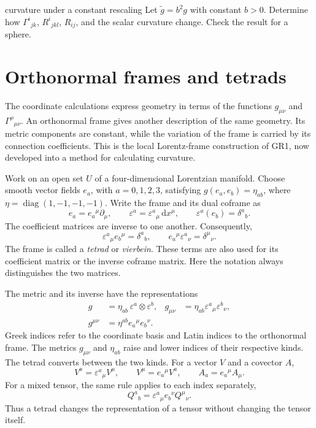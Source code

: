 \documentclass[11pt,a4paper]{article}
\numberwithin{equation}{section}
\newcommand{\dd}{\mathrm d}
\newcommand{\slidesref}[1]{\par\nobreak\smallskip\nobreak{\footnotesize\color{ink!60}\textsc{Source slides #1}}\par\nobreak\smallskip\nobreak}
\begin{document}
\begin{studentwork}[2.7cm]{curvature under a constant rescaling}
Let \(\widetilde g=b^2g\) with constant \(b>0\). Determine how
\(\Gamma^i{}_{jk}\), \(R^i{}_{jkl}\), \(R_{ij}\), and the scalar
curvature change. Check the result for a sphere.
\end{studentwork}

\section{Orthonormal frames and tetrads}
\label{gr2:sec:frames}
\slidesref{15--16}

The coordinate calculations express geometry in terms of the functions
\(g_{\mu\nu}\) and \(\Gamma^\rho{}_{\mu\nu}\). An orthonormal frame gives
another description of the same geometry. Its metric components are
constant, while the variation of the frame is carried by its connection
coefficients. This is the local Lorentz-frame construction of GR1,
now developed into a method for calculating curvature.

Work on an open set \(U\) of a four-dimensional Lorentzian manifold.
Choose smooth vector fields \(e_a\), with \(a=0,1,2,3\), satisfying
\(g(e_a,e_b)=\eta_{ab}\), where
\(\eta=\operatorname{diag}(1,-1,-1,-1)\). Write the frame and its dual
coframe as
\begin{equation}
 e_a=e_a{}^\mu\partial_\mu,
 \qquad
 \varepsilon^a=\varepsilon^a{}_\mu\,\dd x^\mu,
 \qquad
 \varepsilon^a(e_b)=\delta^a{}_b.
 \label{gr2:eq:tetrad-frame}
\end{equation}
The coefficient matrices are inverse to one another. Consequently,
\begin{equation}
 \varepsilon^a{}_\mu e_b{}^\mu=\delta^a{}_b,
 \qquad
 e_a{}^\mu\varepsilon^a{}_\nu=\delta^\mu{}_\nu.
 \label{gr2:eq:tetrad-inverses}
\end{equation}
The frame is called a \emph{tetrad} or \emph{vierbein}. These terms
are also used for its coefficient matrix or the inverse coframe matrix.
Here the notation always distinguishes the two matrices.

The metric and its inverse have the representations
\begin{align}
 g&=\eta_{ab}\,\varepsilon^a\otimes\varepsilon^b,
 &g_{\mu\nu}&=\eta_{ab}\varepsilon^a{}_\mu\varepsilon^b{}_\nu,
 \label{gr2:eq:tetrad-metric}\\
 g^{\mu\nu}&=\eta^{ab}e_a{}^\mu e_b{}^\nu.
 \label{gr2:eq:tetrad-inverse-metric}
\end{align}
Greek indices refer to the coordinate basis and Latin indices to the
orthonormal frame. The metrics \(g_{\mu\nu}\) and \(\eta_{ab}\) raise
and lower indices of their respective kinds. The tetrad converts
between the two kinds. For a vector \(V\) and a covector \(A\),
\begin{equation}
 V^a=\varepsilon^a{}_\mu V^\mu,
 \qquad
 V^\mu=e_a{}^\mu V^a,
 \qquad
 A_a=e_a{}^\mu A_\mu.
 \label{gr2:eq:tetrad-conversion}
\end{equation}
For a mixed tensor, the same rule applies to each index separately,
\[
 Q^a{}_b=\varepsilon^a{}_\mu e_b{}^\nu Q^\mu{}_\nu.
\]
Thus a tetrad changes the representation of a tensor without changing
the tensor itself.
\end{document}
